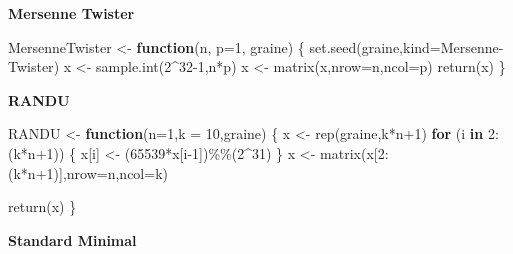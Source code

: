 \documentclass[
]{article}
\newenvironment{Shaded}{\begin{snugshade}}{\end{snugshade}}
\newcommand{\AttributeTok}[1]{\textcolor[rgb]{0.77,0.63,0.00}{#1}}
\newcommand{\ControlFlowTok}[1]{\textcolor[rgb]{0.13,0.29,0.53}{\textbf{#1}}}
\newcommand{\DecValTok}[1]{\textcolor[rgb]{0.00,0.00,0.81}{#1}}
\newcommand{\FunctionTok}[1]{\textcolor[rgb]{0.00,0.00,0.00}{#1}}
\newcommand{\NormalTok}[1]{#1}
\newcommand{\OtherTok}[1]{\textcolor[rgb]{0.56,0.35,0.01}{#1}}
\newcommand{\SpecialCharTok}[1]{\textcolor[rgb]{0.00,0.00,0.00}{#1}}
\newcommand{\StringTok}[1]{\textcolor[rgb]{0.31,0.60,0.02}{#1}}
\begin{document}
\textbf{Mersenne Twister}

\begin{Shaded}
\begin{Highlighting}[]
\NormalTok{MersenneTwister }\OtherTok{\textless{}{-}} \ControlFlowTok{function}\NormalTok{(n, }\AttributeTok{p=}\DecValTok{1}\NormalTok{, graine)}
\NormalTok{\{}
  \FunctionTok{set.seed}\NormalTok{(graine,}\AttributeTok{kind=}\StringTok{\textquotesingle{}Mersenne{-}Twister\textquotesingle{}}\NormalTok{)}
\NormalTok{  x }\OtherTok{\textless{}{-}} \FunctionTok{sample.int}\NormalTok{(}\DecValTok{2}\SpecialCharTok{\^{}}\DecValTok{32{-}1}\NormalTok{,n}\SpecialCharTok{*}\NormalTok{p)}
\NormalTok{  x }\OtherTok{\textless{}{-}} \FunctionTok{matrix}\NormalTok{(x,}\AttributeTok{nrow=}\NormalTok{n,}\AttributeTok{ncol=}\NormalTok{p)}
  \FunctionTok{return}\NormalTok{(x)}
\NormalTok{\}}
\end{Highlighting}
\end{Shaded}

\textbf{RANDU}

\begin{Shaded}
\begin{Highlighting}[]
\NormalTok{RANDU }\OtherTok{\textless{}{-}} \ControlFlowTok{function}\NormalTok{(}\AttributeTok{n=}\DecValTok{1}\NormalTok{,}\AttributeTok{k =} \DecValTok{10}\NormalTok{,graine)}
\NormalTok{\{}
\NormalTok{  x }\OtherTok{\textless{}{-}}  \FunctionTok{rep}\NormalTok{(graine,k}\SpecialCharTok{*}\NormalTok{n}\SpecialCharTok{+}\DecValTok{1}\NormalTok{)}
  \ControlFlowTok{for}\NormalTok{ (i }\ControlFlowTok{in} \DecValTok{2}\SpecialCharTok{:}\NormalTok{(k}\SpecialCharTok{*}\NormalTok{n}\SpecialCharTok{+}\DecValTok{1}\NormalTok{)) \{}
\NormalTok{    x[i] }\OtherTok{\textless{}{-}}\NormalTok{ (}\DecValTok{65539}\SpecialCharTok{*}\NormalTok{x[i}\DecValTok{{-}1}\NormalTok{])}\SpecialCharTok{\%\%}\NormalTok{(}\DecValTok{2}\SpecialCharTok{\^{}}\DecValTok{31}\NormalTok{)}
\NormalTok{  \}}
\NormalTok{  x }\OtherTok{\textless{}{-}} \FunctionTok{matrix}\NormalTok{(x[}\DecValTok{2}\SpecialCharTok{:}\NormalTok{(k}\SpecialCharTok{*}\NormalTok{n}\SpecialCharTok{+}\DecValTok{1}\NormalTok{)],}\AttributeTok{nrow=}\NormalTok{n,}\AttributeTok{ncol=}\NormalTok{k)}
  
  \FunctionTok{return}\NormalTok{(x)}
\NormalTok{\}}
\end{Highlighting}
\end{Shaded}

\textbf{Standard Minimal}
\end{document}

